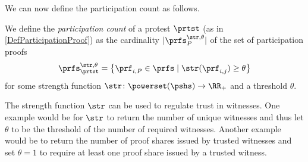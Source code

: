 \NewFunction{\str}{\varsigma}

We can now define the participation count as follows.
\begin{definition}
  We define the \emph{participation count} of a protest \(\prtst\) (as in 
  \cref{DefParticipationProof}) as the cardinality \(|\prfs_{P}^{\str,\theta}|\) 
  of the set of participation proofs \[
    \prfs_{\prtst}^{\str,\theta} = \left\{ \prf_{i,P} \in \prfs \mid
      \str(\prf_{i,j})\geq \theta \right\}
  \] for some strength function \(\str\colon \powerset(\pshs)\to \RR_+\) and a 
  threshold \(\theta\).
\end{definition}
The strength function \(\str\) can be used to regulate trust in witnesses.
One example would be for \(\str\) to return the number of unique witnesses and 
thus let \(\theta\) to be the threshold of the number of required witnesses.
Another example would be to return the number of proof shares issued by trusted 
witnesses and set \(\theta = 1\) to require at least one proof share issued by a 
trusted witness.






